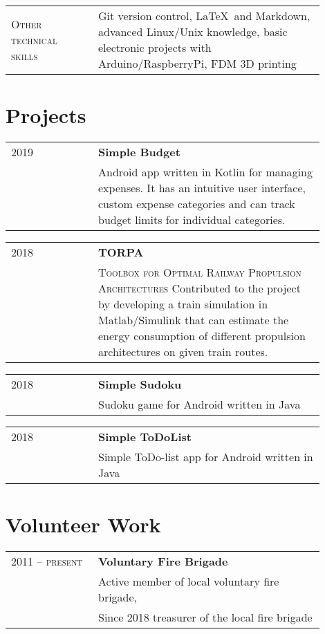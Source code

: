 \documentclass[a4paper, ]{article}
\newenvironment{cventry}[2]
{   
    \setlength{\tabcolsep}{1.25em}
    \hypersetup{urlcolor=black}
    \begin{center}\hspace{-1.25cm}\begin{tabular}{p{0.25\linewidth}|p{0.65\linewidth}}
    \raggedleft\scshape #1 & \bfseries#2 \vspace{0.1cm}\\ & 
}
{\end{tabular}\end{center}}
\newenvironment{cventrynoheading}[1]
{
    \setlength{\tabcolsep}{1.25em}
    \begin{center}\hspace{-1.25cm}\begin{tabular}{p{0.25\linewidth}|p{0.65\linewidth}}
    \raggedleft\scshape #1 & 
}
{\end{tabular}\end{center}}
\newcommand{\newentryline}{\\&}
\begin{document}
\begin{cventrynoheading}{Other technical skills}
    Git version control, \LaTeX\ and Markdown, advanced Linux/Unix knowledge, 
    basic electronic projects with Arduino/RaspberryPi, FDM 3D printing
\end{cventrynoheading}


\section{Projects}

\begin{cventry}{2019}
    {Simple Budget \href{https://github.com/korbi98/Simple-Budget}{\normalfont\faGithub}}
    Android app written in Kotlin for managing expenses. It has an intuitive 
    user interface, custom expense categories and can track budget limits 
    for individual categories.
\end{cventry}

\begin{cventry}{2018}
    {TORPA \href{https://www.researchgate.net/project/TORPA-Toolbox-for-Optimal-Railway-Propulsion-Architectures}{\normalfont\faLink}}
    {\scshape Toolbox for Optimal Railway Propulsion Architectures}
    Contributed to the project by developing a train simulation 
    in Matlab/Simulink that can estimate the energy consumption of 
    different propulsion architectures on given train routes.
\end{cventry}

\begin{cventry}{2018}
    {Simple Sudoku \href{https://github.com/korbi98/Simple-Sudoku}{\normalfont\faGithub}}
    Sudoku game for Android written in Java
\end{cventry}

\begin{cventry}{2018}
    {Simple ToDoList \href{https://github.com/korbi98/Simple-ToDoList}{\normalfont\faGithub}}
    Simple ToDo-list app for Android written in Java
\end{cventry}


\section{Volunteer Work}

\begin{cventry}{2011 -- present}{Voluntary Fire Brigade}
    Active member of local voluntary fire brigade, \newentryline 
    Since 2018 treasurer of the local fire brigade
\end{cventry}
\end{document}

